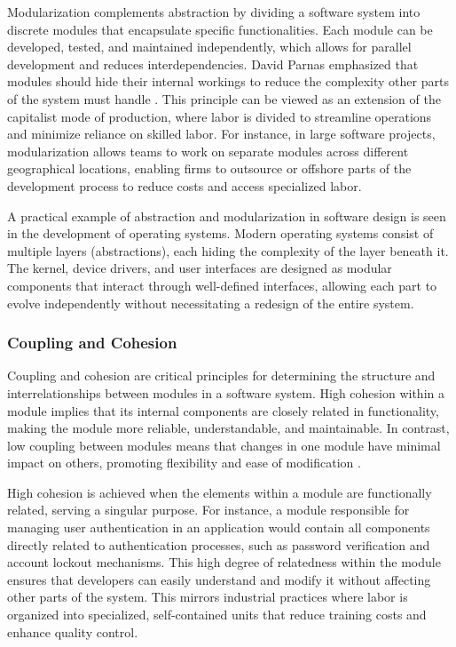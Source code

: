 \begin{refsection}
Modularization complements abstraction by dividing a software system into discrete modules that encapsulate specific functionalities. Each module can be developed, tested, and maintained independently, which allows for parallel development and reduces interdependencies. David Parnas emphasized that modules should hide their internal workings to reduce the complexity other parts of the system must handle \cite[pp.~56-58]{Parnas1972}. This principle can be viewed as an extension of the capitalist mode of production, where labor is divided to streamline operations and minimize reliance on skilled labor. For instance, in large software projects, modularization allows teams to work on separate modules across different geographical locations, enabling firms to outsource or offshore parts of the development process to reduce costs and access specialized labor.

A practical example of abstraction and modularization in software design is seen in the development of operating systems. Modern operating systems consist of multiple layers (abstractions), each hiding the complexity of the layer beneath it. The kernel, device drivers, and user interfaces are designed as modular components that interact through well-defined interfaces, allowing each part to evolve independently without necessitating a redesign of the entire system.

\subsubsection{Coupling and Cohesion}

Coupling and cohesion are critical principles for determining the structure and interrelationships between modules in a software system. High cohesion within a module implies that its internal components are closely related in functionality, making the module more reliable, understandable, and maintainable. In contrast, low coupling between modules means that changes in one module have minimal impact on others, promoting flexibility and ease of modification \cite[pp.~120-123]{Yourdon1979}.

High cohesion is achieved when the elements within a module are functionally related, serving a singular purpose. For instance, a module responsible for managing user authentication in an application would contain all components directly related to authentication processes, such as password verification and account lockout mechanisms. This high degree of relatedness within the module ensures that developers can easily understand and modify it without affecting other parts of the system. This mirrors industrial practices where labor is organized into specialized, self-contained units that reduce training costs and enhance quality control.


\end{refsection}
